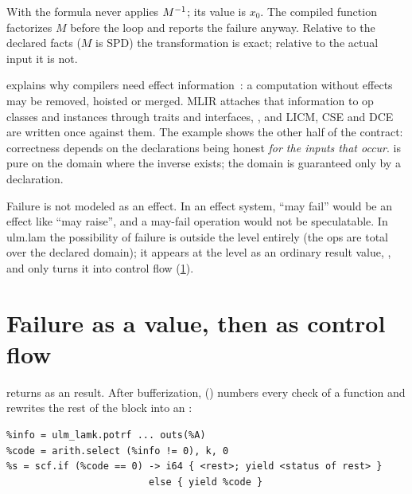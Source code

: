 With  the formula never applies \(M^{-1}\); its value is
\(x_0\). The compiled function factorizes \(M\) before the loop and reports
the failure anyway. Relative to the declared facts (\(M\) is SPD) the
transformation is exact; relative to the actual input it is not.

\begin{theory}
 explains why compilers need
effect information~\cite{effects}: a computation without effects may be removed, hoisted
or merged. MLIR attaches that information to op classes and instances
through traits and interfaces, , and LICM,
CSE and DCE are written once against them. The example shows the other
half of the contract: correctness depends on the declarations being honest
\emph{for the inputs that occur}.  is pure on the
domain where the inverse exists; the domain is guaranteed only by a
declaration.
\end{theory}

\begin{limit}
Failure is not modeled as an effect. In an effect system,
``may fail'' would be an effect like ``may raise'', and a may-fail
operation would not be speculatable. In ulm.lam the possibility of failure
is outside the  level entirely (the ops are total over the
declared domain); it appears at the  level as an ordinary
result value, , and only  turns it into
control flow (\cref{sec:effects-info}).
\end{limit}

\section{Failure as a value, then as control flow}
\label{sec:effects-info}

 returns  as an  result. After
bufferization,  ()
numbers every check of a function and rewrites the rest of the block into
an :

\begin{lstlisting}
%info = ulm_lamk.potrf ... outs(%A)
%code = arith.select (%info != 0), k, 0
%s = scf.if (%code == 0) -> i64 { <rest>; yield <status of rest> }
                         else { yield %code }
\end{lstlisting}

